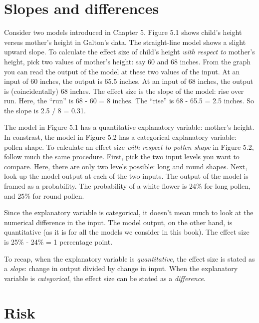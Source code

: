 \documentclass[]{tufte-book}
\begin{document}
\hypertarget{slopes-and-differences}{%
\section{Slopes and differences}\label{slopes-and-differences}}

Consider two models introduced in Chapter 5. Figure 5.1 shows child's height versus mother's height in Galton's data. The straight-line model shows a slight upward slope. To calculate the effect size of child's height \emph{with respect to} mother's height, pick two values of mother's height: say 60 and 68 inches. From the graph you can read the output of the model at these two values of the input. At an input of 60 inches, the output is 65.5 inches. At an input of 68 inches, the output is (coincidentally) 68 inches. The effect size is the slope of the model: rise over run. Here, the ``run'' is 68 - 60 = 8 inches. The ``rise'' is 68 - 65.5 = 2.5 inches. So the slope is 2.5 / 8 = 0.31.

The model in Figure 5.1 has a quantitative explanatory variable: mother's height. In constrast, the model in Figure 5.2 has a categorical explanatory variable: pollen shape. To calculate an effect size \emph{with respect to pollen shape} in Figure 5.2, follow much the same procedure. First, pick the two input levels you want to compare. Here, there are only two levels possible: long and round shapes. Next, look up the model output at each of the two inputs. The output of the model is framed as a probability. The probability of a white flower is 24\% for long pollen, and 25\% for round pollen.

Since the explanatory variable is categorical, it doesn't mean much to look at the numerical difference in the input. The model output, on the other hand, is quantitative (as it is for all the models we consider in this book). The effect size is 25\% - 24\% = 1 percentage point.

To recap, when the explanatory variable is \emph{quantitative}, the effect size is stated as a \emph{slope}: change in output divided by change in input. When the explanatory variable is \emph{categorical}, the effect size can be stated as a \emph{difference}.

\hypertarget{risk}{%
\section{Risk}\label{risk}}
\end{document}
